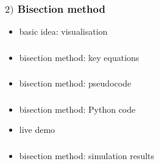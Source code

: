 \documentclass[english,14pt]{beamer}
\begin{document}

\begin{frame}[fragile]

\frametitle{$2)$ Bisection method}

\begin{itemize}
	\item basic idea: visualisation
\end{itemize}

\end{frame}


\begin{frame}[fragile]

\frametitle{}

\begin{itemize}
	\item bisection method: key equations
\end{itemize}

\end{frame}


\begin{frame}[fragile]

\frametitle{}

\begin{itemize}
	\item bisection method: pseudocode
\end{itemize}

\end{frame}


\begin{frame}[fragile]

\frametitle{}

\begin{itemize}
	\item bisection method: Python code
	\item live demo
\end{itemize}

\end{frame}


\begin{frame}[fragile]

\frametitle{}

\begin{itemize}
	\item bisection method: simulation results
\end{itemize}

\end{frame}
\end{document}
